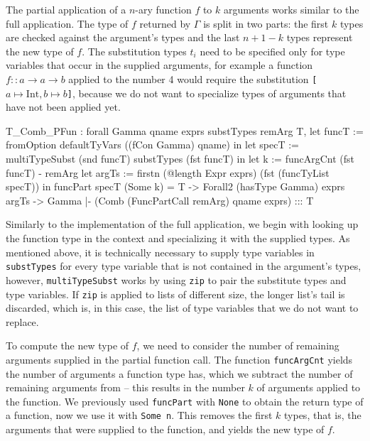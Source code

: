 \documentclass[paper = a4, fleqn, abstract=on, twoside]{scrreprt}
\newcommand{\coqinline}[1]{\texttt{#1}}
\begin{document}
\noindent
The partial application of a $n$-ary function $f$ to $k$ arguments works similar to the full application. The type of $f$ returned by $\Gamma$ is split in two parts: the first $k$ types are checked against the argument's types and the last $n + 1 - k$ types represent the new type of $f$. The substitution types $t_{i}$ need to be specified only for type variables that occur in the supplied arguments, for example a function $f :: a \rightarrow a \rightarrow b$ applied to the number 4 would require the substitution \texttt{[$a \mapsto \text{Int}, b \mapsto b$]}, because we do not want to specialize types of arguments that have not been applied yet.
\begin{coqcode}
T_Comb_PFun : forall Gamma qname exprs substTypes remArg T,
                let funcT := fromOption defaultTyVars ((fCon Gamma) qname) in
                let specT := multiTypeSubst (snd funcT) substTypes (fst funcT) in
                let     k := funcArgCnt (fst funcT) - remArg
                let argTs := firstn (@length Expr exprs) (fst (funcTyList specT))
                 in funcPart specT (Some k) = T ->
                    Forall2 (hasType Gamma) exprs argTs ->
              Gamma |- (Comb (FuncPartCall remArg) qname exprs) ::: T
\end{coqcode}
Similarly to the implementation of the full application, we begin with looking up the function type in the context and specializing it with the supplied types. As mentioned above, it is technically necessary to supply type variables in \coqinline{substTypes} for every type variable that is not contained in the argument's types, however, \coqinline{multiTypeSubst} works by using \coqinline{zip} to pair the substitute types and type variables. If \coqinline{zip} is applied to lists of different size, the longer list's tail is discarded, which is, in this case, the list of type variables that we do not want to replace.
\par
To compute the new type of $f$, we need to consider the number of remaining arguments supplied in the partial function call. The function \coqinline{funcArgCnt} yields the number of arguments a function type has, which we subtract the number of remaining arguments from -- this results in the number $k$ of arguments applied to the function. We previously used \coqinline{funcPart} with \coqinline{None} to obtain the return type of a function, now we use it with \coqinline{Some n}. This removes the first $k$ types, that is, the arguments that were supplied to the function, and yields the new type of $f$.
\par
\end{document}
